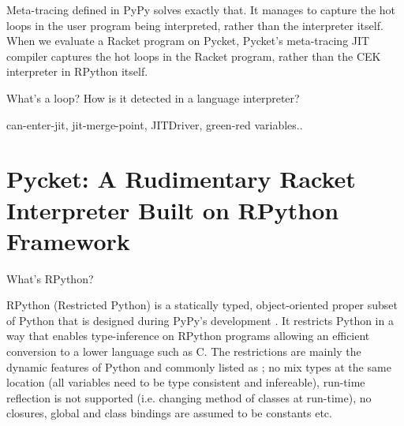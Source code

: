         \begin{paragraph-here}
            Meta-tracing defined in PyPy \cite{pypy-main} solves exactly that. It manages to capture the hot loops in the user program being interpreted, rather than the interpreter itself. When we evaluate a Racket program on Pycket, Pycket's meta-tracing JIT compiler captures the hot loops in the Racket program, rather than the CEK interpreter in RPython itself.
        \end{paragraph-here}

        \begin{paragraph-here}
            What's a loop? How is it detected in a language interpreter?

            can-enter-jit, jit-merge-point, JITDriver, green-red variables..
        \end{paragraph-here}

    \section{Pycket: A Rudimentary Racket Interpreter Built on RPython Framework}
        \label{section:pycket-primer}

        \begin{paragraph-here}
            What's RPython?

            RPython (Restricted Python) is a statically typed, object-oriented
            proper subset of Python that is designed during PyPy's development
            \cite{pypy06}. It restricts Python in a way that enables
            type-inference on RPython programs allowing an efficient conversion to
            a lower language such as C. The restrictions are mainly the dynamic
            features of Python and commonly listed as \cite{rpython07,rpython09};
            no mix types at the same location (all variables need to be type
            consistent and infereable), run-time reflection is not supported
            (i.e. changing method of classes at run-time), no closures, global and
            class bindings are assumed to be constants etc.
        \end{paragraph-here}

